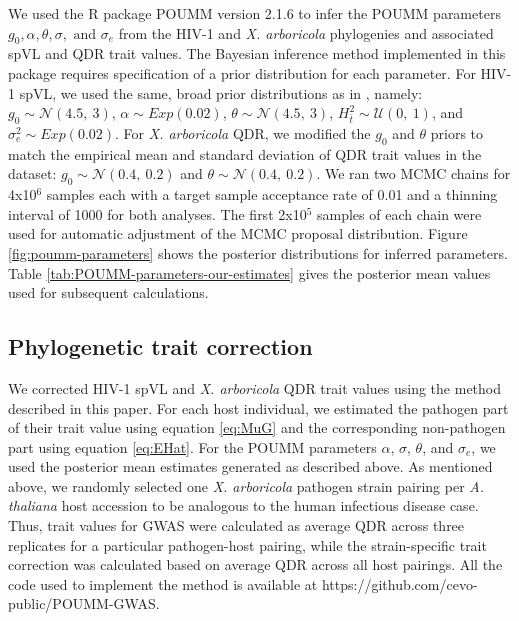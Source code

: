 \documentclass[11pt]{article}
\begin{document}
\begin{linenumbers}
We used the R package POUMM version 2.1.6 \citep{Mitov2017a-POUMM} to infer the POUMM parameters $g_0, \alpha, \theta, \sigma, \text{ and }\sigma_e$ from the HIV-1 and \emph{X. arboricola} phylogenies and associated spVL and QDR trait values. The Bayesian inference method implemented in this package requires specification of a prior distribution for each parameter. For HIV-1 spVL, we used the same, broad prior distributions as in \citet{Mitov2018}, namely: $g_{0} \sim \mathcal{N}(4.5,\ 3)$, $\alpha \sim Exp(0.02)$, $\theta \sim \mathcal{N}(4.5,\ 3)$, $H^2_{\bar{t}} \sim \mathcal{U}(0,\ 1)$, and $\sigma^2_e \sim Exp(0.02)$. For \emph{X. arboricola} QDR, we modified the $g_0$ and $\theta$ priors to match the empirical mean and standard deviation of QDR trait values in the dataset: $g_{0} \sim \mathcal{N}(0.4,\ 0.2)$ and $\theta \sim \mathcal{N}(0.4,\ 0.2)$. We ran two MCMC chains for 4x10$^6$ samples each with a target sample acceptance rate of 0.01 and a thinning interval of 1000 for both analyses. The first 2x10$^5$ samples of each chain were used for automatic adjustment of the MCMC proposal distribution. Figure \ref{fig:poumm-parameters} shows the posterior distributions for inferred parameters. Table \ref{tab:POUMM-parameters-our-estimates} gives the posterior mean values used for subsequent calculations.

\subsection*{Phylogenetic trait correction}
We corrected HIV-1 spVL and \emph{X. arboricola} QDR trait values using the method described in this paper. For each host individual, we estimated the pathogen part of their trait value using equation \ref{eq:MuG} and the corresponding non-pathogen part using equation \ref{eq:EHat}. For the POUMM parameters $\alpha$, $\sigma$, $\theta$, and $\sigma_e$, we used the posterior mean estimates generated as described above. As mentioned above, we randomly selected one \emph{X. arboricola} pathogen strain pairing per \emph{A. thaliana} host accession to be analogous to the human infectious disease case. Thus, trait values for GWAS were calculated as average QDR across three replicates for a particular pathogen-host pairing, while the strain-specific trait correction was calculated based on average QDR across all host pairings. All the code used to implement the method is available at https://github.com/cevo-public/POUMM-GWAS.


\end{linenumbers}
\end{document}
